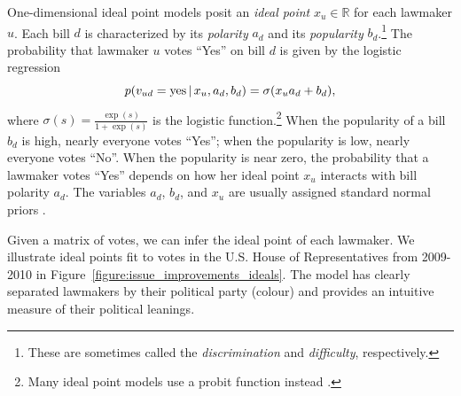 
One-dimensional ideal point models posit an \textit{ideal point} $x_u
\in \mathbb{R}$ for each lawmaker $u$.  Each bill $d$ is characterized
by its \textit{polarity} $a_d$ and its \textit{popularity} $b_d$.\footnote{These are sometimes called the \emph{discrimination} and \emph{difficulty}, respectively.}  The
probability that lawmaker $u$ votes ``Yes'' on bill $d$ is given by
the logistic regression
\begin{equation}
  \label{eq:trad_ipm}
  p(v_{ud} = \textrm{yes} \, | \, x_u, a_d, b_d) =
  \sigma(x_u a_d + b_d),
\end{equation}
where $\sigma(s) = \frac{\exp(s)}{1 + \exp(s)}$ is the logistic
function.\footnote{Many ideal point models use a probit function instead \cite{poole:1991,clinton:2004}.}
When the popularity of a bill $b_d$ is high, nearly everyone votes
``Yes''; when the popularity is low, nearly everyone votes ``No''.
When the popularity is near zero, the probability that a lawmaker
votes ``Yes'' depends on how her ideal point $x_u$ interacts
with bill polarity $a_d$.  The variables $a_d$, $b_d$, and $x_u$ are
usually assigned standard normal priors \cite{clinton:2004}.

Given a matrix of votes, we can infer the ideal point of each
lawmaker.  We illustrate ideal points fit to votes in the U.S. House
of Representatives from 2009-2010 in
Figure~\ref{figure:issue_improvements_ideals}.  The model has clearly
separated lawmakers by their political party (colour) and provides an
intuitive measure of their political leanings.

